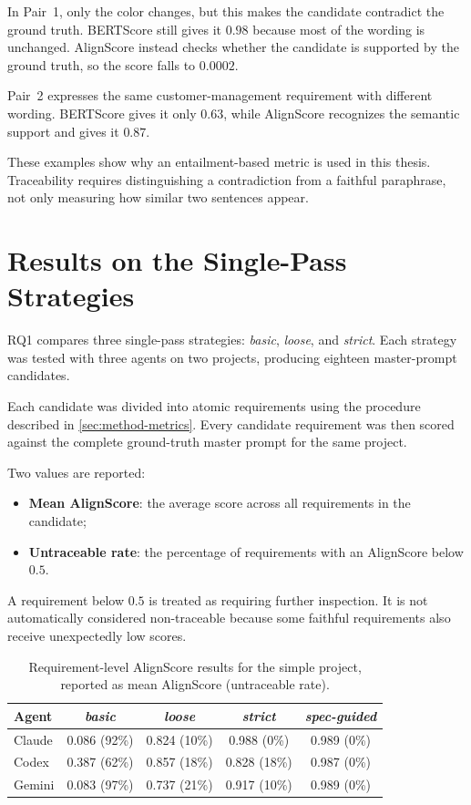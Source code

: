 In Pair~1, only the color changes, but this makes the candidate contradict the
ground truth. BERTScore still gives it $0.98$ because most of the wording is
unchanged. AlignScore instead checks whether the candidate is supported by the
ground truth, so the score falls to $0.0002$.

Pair~2 expresses the same customer-management requirement with different
wording. BERTScore gives it only $0.63$, while AlignScore recognizes the
semantic support and gives it $0.87$.

These examples show why an entailment-based metric is used in this thesis.
Traceability requires distinguishing a contradiction from a faithful
paraphrase, not only measuring how similar two sentences appear.

\section{Results on the Single-Pass Strategies}
\label{sec:results-18}

RQ1 compares three single-pass strategies: \emph{basic}, \emph{loose}, and
\emph{strict}. Each strategy was tested with three agents on two projects,
producing eighteen master-prompt candidates.

Each candidate was divided into atomic requirements using the procedure
described in \cref{sec:method-metrics}. Every candidate requirement was then
scored against the complete ground-truth master prompt for the same project.

Two values are reported:

\begin{itemize}[leftmargin=*]
  \item \textbf{Mean AlignScore}: the average score across all requirements
  in the candidate;
  \item \textbf{Untraceable rate}: the percentage of requirements with an
  AlignScore below $0.5$.
\end{itemize}

A requirement below $0.5$ is treated as requiring further inspection. It is
not automatically considered non-traceable because some faithful requirements also
receive unexpectedly low scores.

\begin{table}[htbp]
  \centering
  \caption{Requirement-level AlignScore results for the simple project, reported as mean AlignScore (untraceable rate).}
  \label{tab:results-simple}
  \begin{tabular}{@{}lcccc@{}}
    \toprule
    Agent & \emph{basic} & \emph{loose} & \emph{strict} & \emph{spec-guided} \\
    \midrule
    Claude & 0.086 (92\%) & 0.824 (10\%) & 0.988 (0\%) & 0.989 (0\%) \\
    Codex  & 0.387 (62\%) & 0.857 (18\%) & 0.828 (18\%) & 0.987 (0\%) \\
    Gemini & 0.083 (97\%) & 0.737 (21\%) & 0.917 (10\%) & 0.989 (0\%) \\
    \bottomrule
  \end{tabular}
\end{table}

